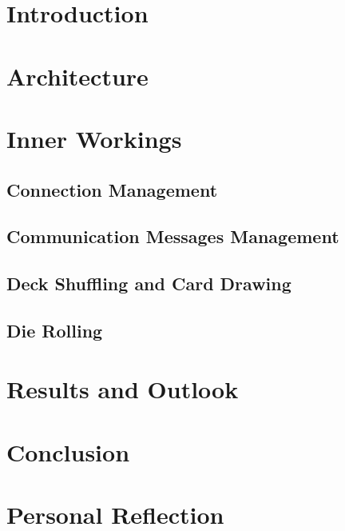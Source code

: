 










\printglossaries

\chapter{Introduction}





\chapter{Architecture}
\chapter{Inner Workings}
\section{Connection Management}
\section{Communication Messages Management}
\section{Deck Shuffling and Card Drawing}
\section{Die Rolling}
\chapter{Results and Outlook}
\chapter{Conclusion}


\appendix
\chapter{Personal Reflection}



